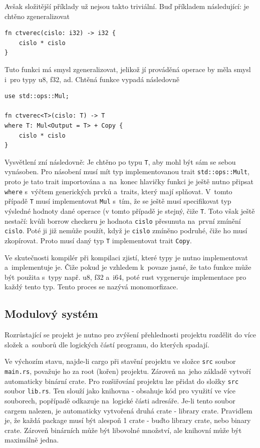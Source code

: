 \documentclass[a4paper, 12pt]{article} %
\newcommand{\rust}[1]{\texttt{#1}}
\begin{document}
		Avšak složitější příklady už nejsou takto triviální. Buď příkladem následující: je chtěno zgeneralizovat
		\begin{verbatim}
fn ctverec(cislo: i32) -> i32 {
	cislo * cislo
}
		\end{verbatim}
		
		Tuto funkci má smysl zgeneralizovat, jelikož jí prováděná operace by měla smysl i~pro typy u8, f32, ad. Chtěná funkce vypadá následovně
		\begin{verbatim}
use std::ops::Mul;

fn ctverec<T>(cislo: T) -> T
where T: Mul<Output = T> + Copy {
	cislo * cislo
}
		\end{verbatim}
		
		Vysvětlení zní následovně: Je chtěno po typu \texttt{T}, aby mohl být sám se sebou vynásoben. Pro násobení musí mít typ implementovanou trait \rust{std::ops::Mult}, proto je tato trait importována a~na~konec hlavičky funkci je ještě nutno připsat \rust{where} s~výčtem generických prvků a~traits, který mají splňovat. V~tomto případě \texttt{T} musí implementovat \rust{Mul} s~tím, že se ještě musí specifikovat typ výsledné hodnoty dané operace (v tomto případě je stejný, čiže \rust{T}. Toto však ještě nestačí: kvůli borrow checkeru je hodnota \rust{cislo} přesunuta na~první zmínění \texttt{cislo}. Poté ji již nemůže použít, když je \texttt{cislo} zmíněno podruhé, čiže ho musí zkopírovat. Proto musí daný typ \texttt{T} implementovat trait \rust{Copy}.
		
		Ve skutečnosti kompilér při kompilaci zjistí, které typy je nutno implementovat a~implementuje je. Čiže pokud je vzhledem k~povaze jasné, že tato funkce může být použita s~typy např. u8, f32 a~i64, poté rust vygeneruje implementace pro každý tento typ. Tento proces se nazývá monomorfizace.

	\subsection{Modulový systém}
		Rozrůstající se projekt je nutno pro zvýšení přehlednosti projektu rozdělit do více složek a~souborů dle logických částí programu, do kterých spadají.
		
		Ve výchozím stavu, najde-li cargo při stavění projektu ve složce \texttt{src} soubor \texttt{main.rs}, považuje ho za root (kořen) projektu. Zároveň na~jeho základě vytvoří automaticky binární crate. Pro rozšiřování projektu lze přidat do složky \texttt{src} soubor \rust{lib.rs}. Ten slouží jako knihovna - obsahuje kód pro využití ve více souborech, popřípadě odkazuje na~logické části adresáře. Je-li tento soubor cargem nalezen, je automaticky vytvořená druhá crate - library crate. Pravidlem je, že každá package musí být alespoň 1 crate - buďto library crate, nebo binary crate. Zároveň binárních může být libovolné množství, ale knihovní může být maximálně jedna.
		
\end{document}
